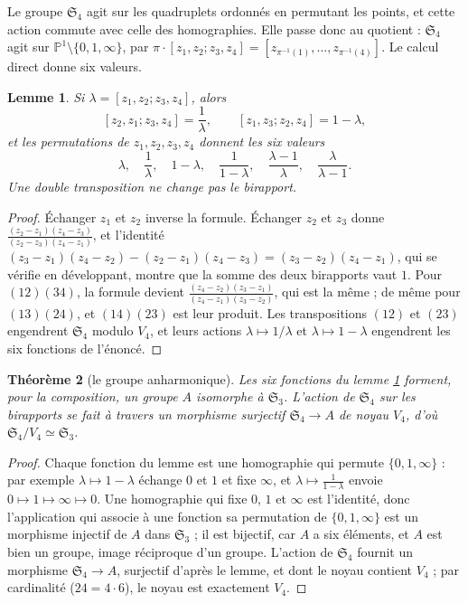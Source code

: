 \documentclass[11pt,a4paper]{article}
\theoremstyle{plain}
\newtheorem{theoreme}{Théorème}[section]
\newtheorem{lemme}[theoreme]{Lemme}
\theoremstyle{definition}
\theoremstyle{remark}
\newcommand{\Pu}{\mathbb{P}^1}
\newcommand{\Sym}{\mathfrak{S}}
\begin{document}
Le groupe $\Sym_4$ agit sur les quadruplets ordonnés en permutant les points, et cette action commute avec celle des homographies. Elle passe donc au quotient : $\Sym_4$ agit sur $\Pu\setminus\{0,1,\infty\}$, par $\pi\cdot[z_1,z_2;z_3,z_4]=[z_{\pi^{-1}(1)},\dots,z_{\pi^{-1}(4)}]$. Le calcul direct donne six valeurs.

\begin{lemme}\label{lem:six}
Si $\lambda=[z_1,z_2;z_3,z_4]$, alors
\[
  [z_2,z_1;z_3,z_4]=\frac1\lambda,\qquad [z_1,z_3;z_2,z_4]=1-\lambda,
\]
et les permutations de $z_1,z_2,z_3,z_4$ donnent les six valeurs
\[
  \lambda,\quad \frac1\lambda,\quad 1-\lambda,\quad \frac1{1-\lambda},\quad \frac{\lambda-1}\lambda,\quad \frac\lambda{\lambda-1} .
\]
Une double transposition ne change pas le birapport.
\end{lemme}

\begin{proof}
Échanger $z_1$ et $z_2$ inverse la formule. Échanger $z_2$ et $z_3$ donne $\frac{(z_2-z_1)(z_4-z_3)}{(z_2-z_3)(z_4-z_1)}$, et l'identité $(z_3-z_1)(z_4-z_2)-(z_2-z_1)(z_4-z_3)=(z_3-z_2)(z_4-z_1)$, qui se vérifie en développant, montre que la somme des deux birapports vaut $1$. Pour $(12)(34)$, la formule devient $\frac{(z_4-z_2)(z_3-z_1)}{(z_4-z_1)(z_3-z_2)}$, qui est la même ; de même pour $(13)(24)$, et $(14)(23)$ est leur produit. Les transpositions $(12)$ et $(23)$ engendrent $\Sym_4$ modulo $V_4$, et leurs actions $\lambda\mapsto1/\lambda$ et $\lambda\mapsto1-\lambda$ engendrent les six fonctions de l'énoncé.
\end{proof}

\begin{theoreme}[le groupe anharmonique]\label{thm:anharmonique}
Les six fonctions du lemme \ref{lem:six} forment, pour la composition, un groupe $A$ isomorphe à $\Sym_3$. L'action de $\Sym_4$ sur les birapports se fait à travers un morphisme surjectif $\Sym_4\to A$ de noyau $V_4$, d'où $\Sym_4/V_4\simeq\Sym_3$.
\end{theoreme}

\begin{proof}
Chaque fonction du lemme est une homographie qui permute $\{0,1,\infty\}$ : par exemple $\lambda\mapsto1-\lambda$ échange $0$ et $1$ et fixe $\infty$, et $\lambda\mapsto\frac1{1-\lambda}$ envoie $0\mapsto1\mapsto\infty\mapsto0$. Une homographie qui fixe $0$, $1$ et $\infty$ est l'identité, donc l'application qui associe à une fonction sa permutation de $\{0,1,\infty\}$ est un morphisme injectif de $A$ dans $\Sym_3$ ; il est bijectif, car $A$ a six éléments, et $A$ est bien un groupe, image réciproque d'un groupe. L'action de $\Sym_4$ fournit un morphisme $\Sym_4\to A$, surjectif d'après le lemme, et dont le noyau contient $V_4$ ; par cardinalité ($24=4\cdot6$), le noyau est exactement $V_4$.
\end{proof}
\end{document}
